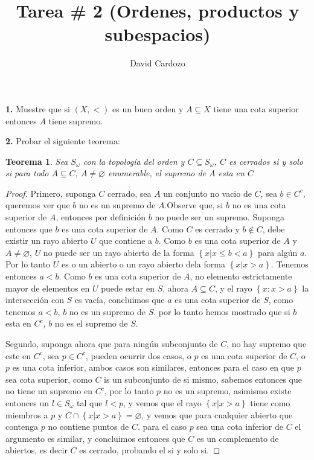 \documentclass[notitlepage]{article}
\author{David Cardozo}
\title{Tarea \# 2 (Ordenes, productos y subespacios)}
\newtheorem{thm}{Teorema}
\newcommand{\set}[1]{\left\lbrace #1 \right\rbrace}
\newcommand{\contained}{\subseteq}
\begin{document}
\maketitle

\textbf{1.} Muestre que si $ (X, < )$ es un buen orden y $A \contained X$ tiene una cota superior entonces $A$ tiene supremo.


\textbf{2.} Probar el siguiente teorema:

\begin{thm}
	Sea $S_{\omega} $ con la topología del orden  y $ C \subseteq S_\omega $, $C $ es cerrados si y solo si para todo $A \contained C$, $ A \neq \varnothing$ enumerable, el supremo de $A$ esta en $C$
\end{thm}

\begin{proof}
	Primero, suponga $C$ cerrado, sea $A$ un conjunto no vacio de $C$, sea $b \in C^c$, queremos ver que $b$ no es un supremo de $A$.Observe que, si $b$ no es una cota superior de $A$, entonces por definición $b$ no puede ser un supremo. Suponga entonces que $b$ es una cota superior de $A$. Como $C$ es cerrado y $b \notin C$, debe existir un rayo abierto $U$ que contiene a $b$. Como $b$ es una cota superior de $A$ y $A \neq \varnothing$, $U$ no puede ser un rayo abierto de la forma $\set{x | x \leq b < a} $ para algún $a$. Por lo tanto $U$ es o un abierto o un rayo abierto dela forma $ \set{x | x > a} $. Tenemos entonces $ a < b$. Como $b$ es una cota superior de $A$, no elemento estrictamente mayor de elementos en $U$ puede estar en $S$, ahora $ A \contained C$, y el rayo $\set{x : x > a}$ la intersección con $S$ es vacía, concluimos que $a$ es una cota superior de $S$, como tenemos $ a < b$, $b$ no es un supremo de $S$. por lo tanto hemos mostrado que si $b$ esta en $C^c$, $b$ no es el supremo de $S$.
	
	 Segundo, suponga ahora que para ningún subconjunto de $C$, no hay supremo que este en $ C^c$, sea $ p \in C^c$, pueden ocurrir dos casos, o $p$ es una cota superior de $C$, o $p$ es una cota inferior, ambos casos son similares, entonces para el caso en que $p$ sea cota superior, como $C$ is un subconjunto de si mismo, sabemos entonces que no tiene un supremo en $C^c$, por lo tanto $p$ no es un supremo, asimismo existe entonces un $l \in S_\omega$ tal que $ l < p$, y vemos que el rayo $\set{x | x>a} $ tiene como miembros a $p$ y $ C \cap \set{x | x>a} = \varnothing $, y vemos que para cualquier abierto que contenga $p$ no contiene puntos de $C$. para el caso $p$ sea una cota inferior de $C$ el argumento es similar, y concluimos entonces que $C$ es un complemento de abiertos, es decir $C$ es cerrado, probando el si y solo si.
	 
\end{proof}
\end{document}
